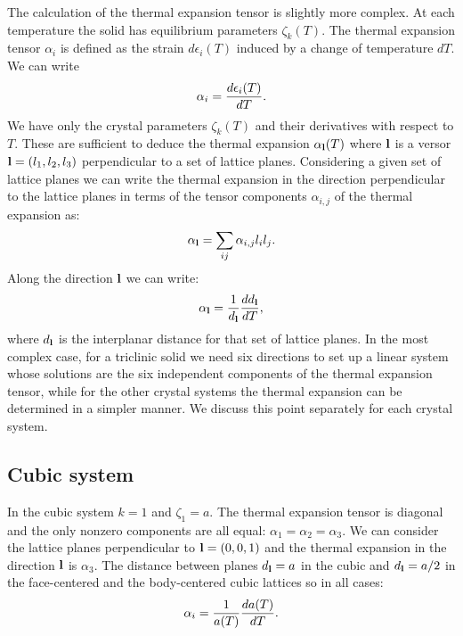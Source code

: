 \documentclass[12pt,a4paper,twoside]{report}
\begin{document}
The calculation of the thermal expansion tensor is slightly more
complex. At each temperature the solid has equilibrium parameters
$\zeta_k(T)$. The thermal expansion tensor $\alpha_{i}$ is defined 
as the strain $d\epsilon_{i}(T)$ induced by a change of temperature $dT$. 
We can write
\begin{equation}
\alpha_{i} = {d \epsilon_{i}(T) \over  d T }.
\end{equation}
We have only the crystal parameters $\zeta_k (T)$ and their derivatives
with respect to $T$. These are sufficient to deduce the thermal expansion
$\alpha_{\bf l}(T)$ where ${\bf l}$ is a versor ${\bf l}=(l_1,l_2,l_3)$ 
perpendicular to a set of lattice planes. Considering 
a given set of lattice planes we can write the thermal expansion in
the direction perpendicular to the lattice planes in terms of the tensor 
components $\alpha_{i,j}$
of the thermal expansion as:
\begin{equation}
\alpha_{{\bf l}} = \sum_{ij} \alpha_{i,j} l_i l_j.
\end{equation}
Along the direction ${\bf l}$ we can write:
\begin{equation}
\alpha_{{\bf l}} = {1 \over d_{\bf l}} {d d_{\bf l} \over d T},
\end{equation}
where $d_{\bf l}$ is the interplanar distance for that set of lattice planes.
In the most complex case, for a triclinic solid we need six directions
to set up a linear system whose solutions are the six independent components
of the thermal expansion tensor, while for the other crystal systems 
the thermal expansion can be determined in a simpler manner.
We discuss this point separately for each crystal system.

{\color{web-blue}\subsection{Cubic system}}
\color{black}
In the cubic system $k=1$ and $\zeta_1=a$. 
The thermal expansion tensor is diagonal and the only nonzero components
are all equal: $\alpha_1=\alpha_2=\alpha_3$. We can consider the 
lattice planes perpendicular to ${\bf l}=(0,0,1)$ and the thermal expansion
in the direction ${\bf l}$ is $\alpha_3$. The distance between planes
$d_{\bf l}=a$ in the cubic and $d_{\bf l}=a/2$ in the face-centered
and the body-centered cubic lattices so in all cases:  
\begin{equation}
\alpha_{i} =  {1\over a(T) } {d a(T) \over dT}.
\end{equation}
\end{document}
